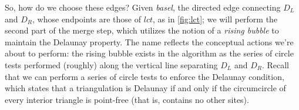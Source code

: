 \documentclass[12pt,twoside]{reedthesis}
\begin{document}

    So, how do we choose these edges? Given \emph{basel}, the directed edge connecting $D_{L}$ and $D_{R}$, whose endpoints are those of $lct$, as in \cref{fig:lct}; we will perform the second part of the merge step, which utilizes the notion of a \emph{rising bubble} to maintain the Delaunay property. The name reflects the conceptual actions we're about to perform: the rising bubble exists in the algorithm as the series of circle tests performed (roughly) along the vertical line separating $D_{L}$ and $D_{R}$. Recall that we can perform a series of circle tests to enforce the Delaunay condition, which states that a triangulation is Delaunay if and only if the circumcircle of every interior triangle is point-free (that is, contains no other sites).
\end{document}
